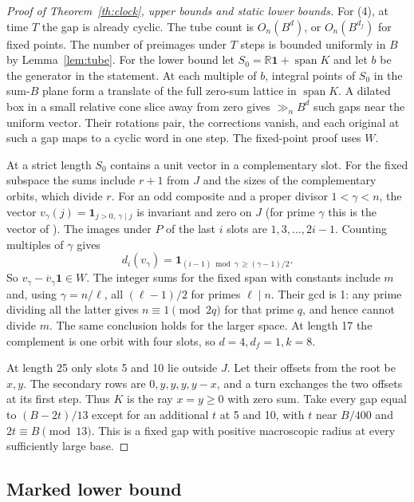 \documentclass[11pt]{amsart}
\theoremstyle{definition}
\newcommand{\R}{\mathbb R}
\newcommand{\one}{\mathbf 1}
\begin{document}
\begin{proof}[Proof of Theorem~\ref{th:clock}, upper bounds and static lower bounds]
For (4), at time \(T\) the gap is already cyclic. The tube count
is \(O_n(B^d)\), or \(O_n(B^{d_f})\) for fixed points. The number
of preimages under \(T\) steps is bounded uniformly in \(B\) by
Lemma~\ref{lem:tube}. For the lower bound let
\(S_0=\R\one+\operatorname{span}K\) and let \(b\) be the generator
in the statement. At each multiple of \(b\), integral points of
\(S_0\) in the sum-\(B\) plane form a translate of the full
zero-sum lattice in \(\operatorname{span}K\).
A dilated box in a small relative cone slice away from zero gives
\(\gg_n B^d\) such gaps near the uniform vector. Their rotations
pair, the corrections vanish, and each original at such a gap
maps to a cyclic word in one step. The fixed-point proof uses \(W\).

At a strict length \(S_0\) contains a unit vector in a
complementary slot. For the fixed subspace the sums include
\(r+1\) from \(J\) and the sizes of the complementary orbits,
which divide \(r\). For an odd composite and a proper divisor
\(1<\gamma<n\), the vector \(v_\gamma(j)=\one_{j>0,\ \gamma\mid j}\) is
invariant and zero on \(J\) (for prime \(\gamma\) this is the vector of
\cite[Section~3]{G10}). The images under \(P\) of the last \(i\) slots
are \(1,3,\ldots,2i-1\). Counting multiples of \(\gamma\) gives
\[
 d_i(v_\gamma)=\one_{(i-1)\bmod\gamma\,\ge(\gamma-1)/2}.
\]
So \(v_\gamma-\overline v_\gamma\one\in W\). The integer sums for the
fixed span with constants include \(m\) and, using \(\gamma=n/\ell\),
all \((\ell-1)/2\) for primes \(\ell\mid n\). Their gcd is 1:
any prime dividing all the latter gives \(n\equiv1\pmod{2q}\)
for that prime \(q\), and hence cannot divide \(m\).
The same conclusion holds for the larger space.
At length 17 the complement is one orbit with four slots,
so \(d=4,d_f=1,k=8\).

At length 25 only slots 5 and 10 lie outside \(J\).
Let their offsets from the root be \(x,y\). The secondary rows
are \(0,y,y,y,y-x\), and a turn exchanges the two offsets at its
first step. Thus \(K\) is the ray \(x=y\ge0\) with zero sum.
Take every gap equal to \((B-2t)/13\) except for an additional
\(t\) at 5 and 10, with \(t\) near \(B/400\) and
\(2t\equiv B\pmod{13}\). This is a fixed gap with positive
macroscopic radius at every sufficiently large base.
\end{proof}

\subsection{Marked lower bound}\label{sec:transport}
\end{document}
